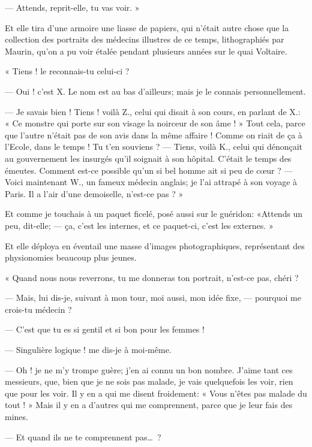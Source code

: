 --- Attends, reprit{}-elle, tu vas voir. »

Et elle tira d’une armoire une liasse de papiers, qui
n’était autre chose que la collection des portraits
des médecins illustres de ce temps, lithographiés par Maurin,
qu’on a pu voir étalée pendant plusieurs années sur le
quai Voltaire.

« Tiens ! le reconnais{}-tu celui{}-ci ?

--- Oui ! c’est X. Le nom est au bas
d’ailleurs; mais je le connais personnellement.

--- Je savais bien ! Tiens ! voilà Z., celui qui disait à son cours, en
parlant de X.: « Ce monstre qui porte sur son visage la noirceur de son
âme ! » Tout cela, parce que l’autre
n’était pas de son avis dans la même affaire ! Comme
on riait de ça à l’Ecole, dans le temps ! Tu
t’en souviens ? --- Tiens, voilà K., celui qui dénonçait
au gouvernement les insurgés qu’il soignait à son
hôpital. C’était le temps des émeutes. Comment
est{}-ce possible qu’un si bel homme ait si peu de
c\oe ur ? --- Voici maintenant W., un fameux médecin anglais; je
l’ai attrapé à son voyage à Paris. Il a
l’air d’une demoiselle,
n’est{}-ce pas ? »

Et comme je touchais à un paquet ficelé, posé aussi sur le guéridon:
«Attends un peu, dit{}-elle; --- ça, c’est les internes,
et ce paquet{}-ci, c’est les externes. »

Et elle déploya en éventail une masse d’images
photographiques, représentant des physionomies beaucoup plus jeunes.

« Quand nous nous reverrons, tu me donneras ton portrait,
n’est{}-ce pas, chéri ?

--- Mais, lui dis{}-je, suivant à mon tour, moi aussi, mon idée fixe, ---
pourquoi me crois{}-tu médecin ?

--- C’est que tu es si gentil et si bon pour les femmes !

--- Singulière logique ! me dis{}-je à moi{}-même.

--- Oh ! je ne m’y trompe guère; j’en ai
connu un bon nombre. J’aime tant ces messieurs, que,
bien que je ne sois pas malade, je vais quelquefois les voir, rien que
pour les voir. Il y en a qui me disent froidement: « Vous
n’êtes pas malade du tout ! » Mais il y en a
d’autres qui me comprennent, parce que je leur fais
des mines.

--- Et quand ils ne te comprennent pas\ldots\ ?

